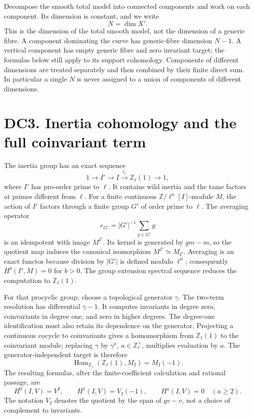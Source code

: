 \documentclass[
]{report}
\begin{document}
Decompose the smooth total model into connected components and work on
each component. Its dimension is constant, and we write \[
N=\dim X'.
\tag{DC2.5}
\] This is the dimension of the total smooth model, not the dimension of
a generic fibre. A component dominating the curve has generic-fibre
dimension \(N-1\). A vertical component has empty generic fibre and zero
invariant target; the formulas below still apply to its support
cohomology. Components of different dimensions are treated separately
and then combined by their finite direct sum. In particular a single
\(N\) is never assigned to a union of components of different
dimensions.

\section{DC3. Inertia cohomology and the full coinvariant
term}\label{dc3.-inertia-cohomology-and-the-full-coinvariant-term}

The inertia group has an exact sequence \[
1\longrightarrow I'\longrightarrow I
 \xrightarrow{t_\ell}\mathbb Z_\ell(1)\longrightarrow1,
\tag{DC3.1}
\] where \(I'\) has pro-order prime to \(\ell\). It contains wild
inertia and the tame factors at primes different from \(\ell\). For a
finite continuous \(\mathbb Z/\ell^n[I]\)-module \(M\), the action of
\(I'\) factors through a finite group \(G'\) of order prime to \(\ell\).
The averaging operator \[
e_{G'}=|G'|^{-1}\sum_{g\in G'}g
\tag{DC3.2}
\] is an idempotent with image \(M^{I'}\). Its kernel is generated by
\(gm-m\), so the quotient map induces the canonical isomorphism
\(M^{I'}\simeq M_{I'}\). Averaging is an exact functor because division
by \(|G'|\) is defined modulo \(\ell^n\); consequently \(H^b(I',M)=0\)
for \(b>0\). The group extension spectral sequence reduces the
computation to \(\mathbb Z_\ell(1)\).

For that procyclic group, choose a topological generator \(\gamma\). The
two-term resolution has differential \(\gamma-1\). It computes
invariants in degree zero, coinvariants in degree one, and zero in
higher degrees. The degree-one identification must also retain its
dependence on the generator. Projecting a continuous cocycle to
coinvariants gives a homomorphism from \(\mathbb Z_\ell(1)\) to the
coinvariant module; replacing \(\gamma\) by \(\gamma^a\),
\(a\in\mathbb Z_\ell^\times\), multiplies evaluation by \(a\). The
generator-independent target is therefore \[
\operatorname{Hom}_{\mathbb Z_\ell}(\mathbb Z_\ell(1),M_I)
 =M_I(-1).
\tag{DC3.3}
\] The resulting formulas, after the finite-coefficient calculation and
rational passage, are \[
H^0(I,V)=V^I,\qquad
H^1(I,V)=V_I(-1),\qquad
H^a(I,V)=0\quad(a\ge2).
\tag{DC3.4}
\] The notation \(V_I\) denotes the quotient by the span of \(gv-v\),
not a choice of complement to invariants.
\end{document}
